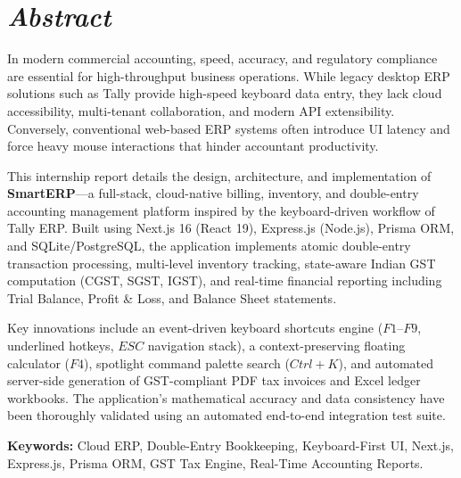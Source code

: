 \chapter*{\textbf{\textit{Abstract}}}

\begingroup
\setlength{\parskip}{0.6cm}
\setlength{\parindent}{0pt}

In modern commercial accounting, speed, accuracy, and regulatory compliance are essential for high-throughput business operations. While legacy desktop ERP solutions such as Tally provide high-speed keyboard data entry, they lack cloud accessibility, multi-tenant collaboration, and modern API extensibility. Conversely, conventional web-based ERP systems often introduce UI latency and force heavy mouse interactions that hinder accountant productivity.

This internship report details the design, architecture, and implementation of \textbf{SmartERP}---a full-stack, cloud-native billing, inventory, and double-entry accounting management platform inspired by the keyboard-driven workflow of Tally ERP. Built using Next.js 16 (React 19), Express.js (Node.js), Prisma ORM, and SQLite/PostgreSQL, the application implements atomic double-entry transaction processing, multi-level inventory tracking, state-aware Indian GST computation (CGST, SGST, IGST), and real-time financial reporting including Trial Balance, Profit \& Loss, and Balance Sheet statements.

Key innovations include an event-driven keyboard shortcuts engine ($F1$--$F9$, underlined hotkeys, $ESC$ navigation stack), a context-preserving floating calculator ($F4$), spotlight command palette search ($Ctrl+K$), and automated server-side generation of GST-compliant PDF tax invoices and Excel ledger workbooks. The application's mathematical accuracy and data consistency have been thoroughly validated using an automated end-to-end integration test suite.

\textbf{Keywords:} Cloud ERP, Double-Entry Bookkeeping, Keyboard-First UI, Next.js, Express.js, Prisma ORM, GST Tax Engine, Real-Time Accounting Reports.

\endgroup
